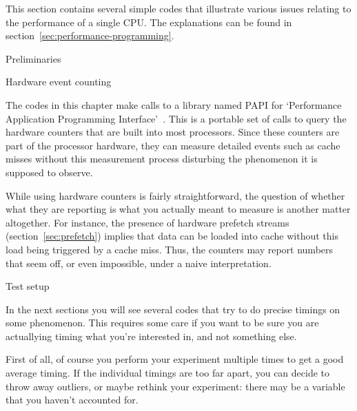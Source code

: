 
This section contains several simple codes that illustrate various
issues relating to the performance of a single CPU. The explanations
can be found in section~\ref{sec:performance-programming}.

 {Preliminaries}

 {Hardware event counting}
\label{sec:papi}

The codes in this chapter make calls to a library named PAPI for
`Performance Application Programming
Interface'~\cite{Brown:IJHPCA:papi,papi-homepage}. This is a portable set of calls
to query the hardware counters that are built into most
processors. Since these counters are part of the processor hardware,
they can measure detailed events such as cache misses without this
measurement process disturbing the phenomenon it is supposed to
observe.

While using hardware counters is fairly straightforward, the question
of whether what they are reporting is what you actually meant to
measure is another matter altogether. For instance, the presence of
hardware prefetch streams (section~\ref{sec:prefetch}) implies that
data can be loaded into cache without this load being triggered by a
cache miss. Thus, the counters may report numbers that seem off, or
even impossible, under a naive interpretation.

 {Test setup}

In the next sections you will see several codes that try to do 
precise timings on some phenomenon. This requires some care if you
want to be sure you are actuallying timing what you're interested in, and
not something else. 

First of all, of course you perform your experiment 
multiple times to get a good average timing. If the individual timings
are too far apart, you can decide to throw away outliers, or maybe
rethink your experiment: there may be a variable that you haven't accounted
for.

